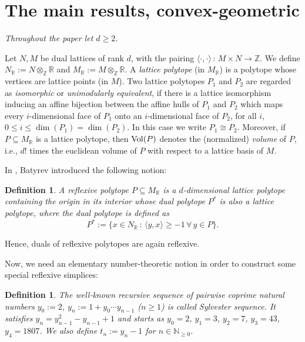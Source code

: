\documentclass[a4paper,twoside]{article}
\newcommand{\pro}[2]{\langle #1, #2 \rangle}
\def\N{{\mathbb N}}
\def\R{{\mathbb R}}
\def\Z{{\mathbb Z}}
\def\vol{{\rm Vol}}
\def\NR{{N_{\R}}}
\def\MR{{M_{\R}}}
\newtheorem{definition}[theorem]{Definition}
\begin{document}
\section{The main results, convex-geometric}

{\em Throughout the paper let $d \geq 2$.}

\smallskip

Let $N,M$ be dual lattices of rank $d$, with the pairing $\pro{\cdot}{\cdot} \,:\, M \times N \to \Z$. 
We define $\NR := N \otimes_\Z \R$ and $\MR := M \otimes_\Z \R$. 
A {\em lattice polytope} (in $\MR$) is a polytope 
whose vertices are lattice points (in $M$). Two lattice polytopes $P_1$ and $P_2$ are regarded as {\em isomorphic} or {\em unimodularly equivalent}, if 
there is a lattice isomorphism inducing an affine bijection between the affine hulls of $P_1$ and $P_2$ which maps 
every $i$-dimensional face of $P_1$ onto an $i$-dimensional face of $P_2$, for all $i$, $0 \leq i \leq \dim(P_1) = \dim(P_2)$. 
In this case we write $P_1 \cong P_2$. Moreover, if $P \subseteq \MR$ is a lattice polytope, then 
$\vol(P)$ denotes the (normalized) {\em volume} of $P$, i.e., $d!$ times the euclidean volume of $P$ with respect to a lattice basis of $M$.

\smallskip

In \cite{Bat94}, Batyrev introduced the following notion:

\begin{definition}{\rm 
A {\em reflexive polytope} $P \subseteq \MR$ is a $d$-dimensional lattice polytope containing the origin in its interior 
whose dual polytope $P^*$ is also a lattice polytope, where the dual polytope is defined as
$$P^* := \{x \in \NR \,:\, \pro{y}{x} \geq -1 \,\forall\, y \in P\}.$$
}
\end{definition}

Hence, duals of reflexive polytopes are again reflexive.

\smallskip

Now, we need an elementary number-theoretic notion in order to construct some special reflexive simplices:

\begin{definition}{\rm 
The well-known recursive sequence \cite[A000058]{Slo04} of pairwise coprime natural numbers 
$y_0 := 2$, $y_n := 1 + y_0 \cdots y_{n-1}$ ($n \geq 1$) is called {\em Sylvester sequence}. 
It satisfies $y_n = y_{n-1}^2 - y_{n-1} + 1$ and starts as 
$y_0 = 2$, $y_1 = 3$, $y_2 = 7$, $y_3 = 43$, $y_4 = 1807$. 
We also define $t_n := y_n - 1$ for $n \in \N_{\geq 0}$.
\label{sylvester}
}
\end{definition}
\end{document}
